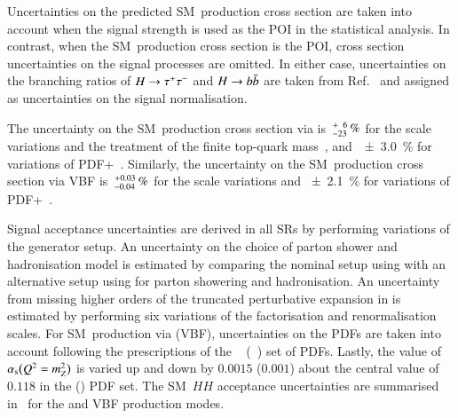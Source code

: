 Uncertainties on the predicted SM~\HH production cross section are taken into
account when the signal strength is used as the POI in the statistical
analysis. In contrast, when the SM~\HH production cross section is the POI,
cross section uncertainties on the signal processes are omitted. In either case,
uncertainties on the branching ratios of $H \to \tau^{+} \tau^{-}$ and $H \to b\bar{b}$ are
taken from Ref.~\cite{deFlorian:2016spz_book} and assigned as uncertainties on the
signal normalisation.

The uncertainty on the SM~\HH production cross section via \ggF
is~$^{\hspace{0.25pt}+\hspace{0.25pt}\phantom{2}6}_{-23}\,\si{\percent}$
for the scale variations and the treatment of the finite top-quark
mass~\cite{Baglio:2020wgt}, and~\SI{\pm 3.0}{\percent} for variations of
PDF+\alphas~\cite{LHCHWGHH}. Similarly, the uncertainty on the SM~\HH production
cross section via VBF
is~$^{\hspace{0.25pt}+\hspace{0.25pt}0.03}_{-0.04}\,\si{\percent}$ for
the scale variations and \SI{\pm 2.1}{\percent} for variations of
PDF+\alphas~\cite{LHCHWGHH}.

Signal acceptance uncertainties are derived in all SRs by performing variations
of the generator setup. An uncertainty on the choice of parton shower and
hadronisation model is estimated by comparing the nominal setup using \PYTHIA[8]
with an alternative setup using \HERWIG[7] for parton showering and
hadronisation. An uncertainty from missing higher orders of the truncated
perturbative expansion in \alphas is estimated by performing six variations of
the factorisation and renormalisation scales. For SM~\HH production via \ggF
(VBF), uncertainties on the PDFs are taken into account following the
prescriptions of the \PDFforLHC[15nlo]~\cite{Butterworth:2015oua}
(\NNPDF[3.0nlo]~\cite{Ball:2014uwa}) set of PDFs. Lastly, the value
of~$\alpha_{\text{s}}\mathopen{}\bigl( Q^2 = m_{Z}^2 \bigr)\mathclose{}$ is varied up and
down by $0.0015$ ($0.001$) about the central value of $0.118$ in the
\PDFforLHC[15nlo] (\NNPDF[3.0nlo]) PDF set. The SM~$HH$ acceptance uncertainties
are summarised in~ for the \ggF and VBF
production modes.


